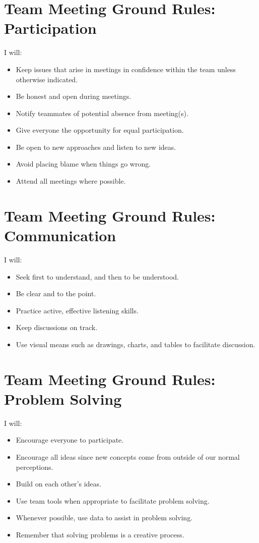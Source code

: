 \begin{appendices}
\section{Team Meeting Ground Rules: Participation}
I will:
\begin{itemize}
    \item Keep issues that arise in meetings in confidence within the team unless otherwise indicated.
    \item Be honest and open during meetings.
    \item Notify teammates of potential absence from meeting(s).
    \item Give everyone the opportunity for equal participation.
    \item Be open to new approaches and listen to new ideas.
    \item Avoid placing blame when things go wrong.
    \item Attend all meetings where possible.
\end{itemize}

\section{Team Meeting Ground Rules: Communication}
I will:
\begin{itemize}
    \item Seek first to understand, and then to be understood.
    \item Be clear and to the point.
    \item Practice active, effective listening skills.
    \item Keep discussions on track.
    \item Use visual means such as drawings, charts, and tables to facilitate discussion.
\end{itemize}

\section{Team Meeting Ground Rules: Problem Solving}
I will:
\begin{itemize}
    \item Encourage everyone to participate.
    \item Encourage all ideas since new concepts come from outside of our normal perceptions.
    \item Build on each other's ideas.
    \item Use team tools when appropriate to facilitate problem solving.
    \item Whenever possible, use data to assist in problem solving.
    \item Remember that solving problems is a creative process.
\end{itemize}


\end{appendices}
